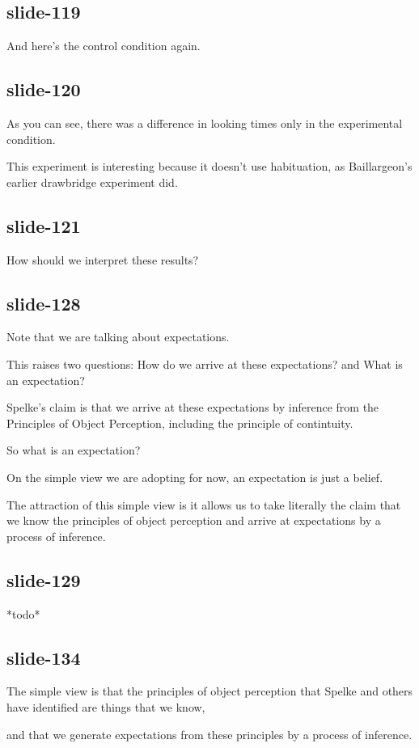 \documentclass[12pt,\papersize]{extarticle}
\begin{document}
\subsection{slide-119}
And here's the control condition again.
 
\subsection{slide-120}
As you can see, there was a difference in looking times only in the experimental condition.
 
This experiment is interesting because it doesn't use habituation, as Baillargeon's earlier drawbridge experiment did.
 
\subsection{slide-121}
How should we interpret these results?
 
\subsection{slide-128}
Note that we are talking about expectations.
 
This raises two questions: How do we arrive at these expectations? and What is an expectation?
 
Spelke's claim is that we arrive at these expectations by inference from the Principles of Object Perception, including the principle of contintuity.
 
So what is an expectation?
 
On the simple view we are adopting for now, an expectation is just a belief.
 
The attraction of this simple view is it allows us to take literally the claim that we know the principles of object perception and arrive at expectations by a process of inference.
 
\subsection{slide-129}
*todo*
 
\subsection{slide-134}
The simple view is that the principles of object perception that Spelke and others have identified are things that we know,
 
and that we generate expectations from these principles by a process of inference.
 
\end{document}
